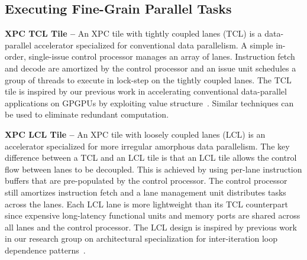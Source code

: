
\subsection{Executing Fine-Grain Parallel Tasks}


\textbf{XPC TCL Tile --} An XPC tile with tightly coupled lanes (TCL) is
a data-parallel accelerator specialized for conventional data
parallelism. A simple in-order, single-issue control processor manages an
array of lanes. Instruction fetch and decode are amortized by the control
processor and an issue unit schedules a group of threads to execute in
lock-step on the tightly coupled lanes.
The TCL tile is inspired by our previous work in accelerating
conventional data-parallel applications on GPGPUs by exploiting value
structure~\cite{kim-simt-vstruct-isca2013}. Similar techniques can be
used to eliminate redundant computation.


\textbf{XPC LCL Tile --} An XPC tile with loosely coupled lanes (LCL) is
an accelerator specialized for more irregular amorphous data parallelism.
The key difference between a TCL and an LCL tile is that an LCL tile
allows the control flow between lanes to be decoupled. This is achieved
by using per-lane instruction buffers that are pre-populated by the
control processor. The control processor still amortizes instruction
fetch and a lane management unit distributes tasks across the lanes. Each
LCL lane is more lightweight than its TCL counterpart since expensive
long-latency functional units and memory ports are shared across all
lanes and the control processor.
The LCL design is inspired by previous work in our research group on
architectural specialization for inter-iteration loop dependence
patterns~\cite{srinath-xloops-micro2014}.

